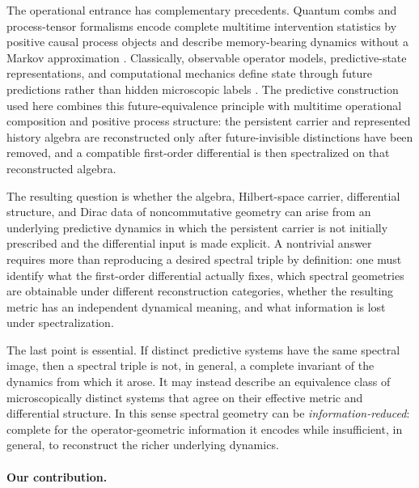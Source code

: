 \documentclass[11pt]{article}
\theoremstyle{definition}
\theoremstyle{remark}
\theoremstyle{definition}
\theoremstyle{remark}
\begin{document}
The operational entrance has complementary precedents.  Quantum combs and
process-tensor formalisms encode complete multitime intervention statistics by
positive causal process objects and describe memory-bearing dynamics without a
Markov approximation
\cite{ChiribellaDArianoPerinotti2009,PollockProcessTensor2018,PollockEtAl2018}.
Classically, observable operator models, predictive-state representations, and
computational mechanics define state through future predictions rather than hidden
microscopic labels
\cite{Jaeger2000,LittmanSuttonSingh2001,SinghJamesRudary2004,
CrutchfieldYoung1989,shalizicrutchfield,TraversCrutchfield2025,
MarzenCrutchfield2017}.  The predictive construction used here combines this
future-equivalence principle with multitime operational composition and positive
process structure: the persistent carrier and represented history algebra are
reconstructed only after future-invisible distinctions have been removed, and a
compatible first-order differential is then spectralized on that reconstructed
algebra.

The resulting question is whether the algebra, Hilbert-space carrier,
differential structure, and Dirac data of noncommutative geometry can arise from
an underlying predictive dynamics in which the persistent carrier is not initially prescribed and the differential
input is made explicit.
A nontrivial answer requires more than reproducing a desired spectral triple by
definition: one must identify what the first-order differential actually fixes,
which spectral geometries are obtainable under different reconstruction
categories, whether the resulting metric has an independent dynamical meaning,
and what information is lost under spectralization.

The last point is essential.  If distinct predictive systems have the same
spectral image, then a spectral triple is not, in general, a complete invariant of
the dynamics from which it arose.  It may instead describe an equivalence class
of microscopically distinct systems that agree on their effective metric and
differential structure.  In this sense spectral geometry can be
\emph{information-reduced}: complete for the operator-geometric information it
encodes while insufficient, in general, to reconstruct the richer underlying
dynamics.

\paragraph{Our contribution.}
\end{document}
